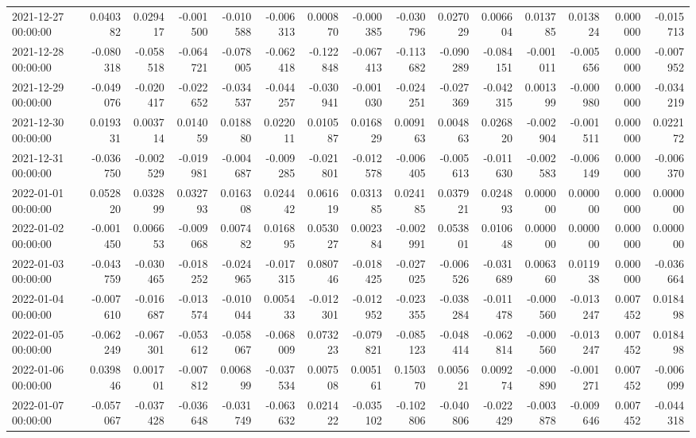 \begin{tabular}{lrrrrrrrrrrrrrr}
2021-12-27 00:00:00 & 0.040382 & 0.029417 & -0.001500 & -0.010588 & -0.006313 & 0.000870 & -0.000385 & -0.030796 & 0.027029 & 0.006604 & 0.013785 & 0.013824 & 0.000000 & -0.015713 \\
2021-12-28 00:00:00 & -0.080318 & -0.058518 & -0.064721 & -0.078005 & -0.062418 & -0.122848 & -0.067413 & -0.113682 & -0.090289 & -0.084151 & -0.001011 & -0.005656 & 0.000000 & -0.007952 \\
2021-12-29 00:00:00 & -0.049076 & -0.020417 & -0.022652 & -0.034537 & -0.044257 & -0.030941 & -0.001030 & -0.024251 & -0.027369 & -0.042315 & 0.001399 & -0.000980 & 0.000000 & -0.034219 \\
2021-12-30 00:00:00 & 0.019331 & 0.003714 & 0.014059 & 0.018880 & 0.022011 & 0.010587 & 0.016829 & 0.009163 & 0.004863 & 0.026820 & -0.002904 & -0.001511 & 0.000000 & 0.022172 \\
2021-12-31 00:00:00 & -0.036750 & -0.002529 & -0.019981 & -0.004687 & -0.009285 & -0.021801 & -0.012578 & -0.006405 & -0.005613 & -0.011630 & -0.002583 & -0.006149 & 0.000000 & -0.006370 \\
2022-01-01 00:00:00 & 0.052820 & 0.032899 & 0.032793 & 0.016308 & 0.024442 & 0.061619 & 0.031385 & 0.024185 & 0.037921 & 0.024893 & 0.000000 & 0.000000 & 0.000000 & 0.000000 \\
2022-01-02 00:00:00 & -0.001450 & 0.006653 & -0.009068 & 0.007482 & 0.016895 & 0.053027 & 0.002384 & -0.002991 & 0.053801 & 0.010648 & 0.000000 & 0.000000 & 0.000000 & 0.000000 \\
2022-01-03 00:00:00 & -0.043759 & -0.030465 & -0.018252 & -0.024965 & -0.017315 & 0.080746 & -0.018425 & -0.027025 & -0.006526 & -0.031689 & 0.006360 & 0.011938 & 0.000000 & -0.036664 \\
2022-01-04 00:00:00 & -0.007610 & -0.016687 & -0.013574 & -0.010044 & 0.005433 & -0.012301 & -0.012952 & -0.023355 & -0.038284 & -0.011478 & -0.000560 & -0.013247 & 0.007452 & 0.018498 \\
2022-01-05 00:00:00 & -0.062249 & -0.067301 & -0.053612 & -0.058067 & -0.068009 & 0.073223 & -0.079821 & -0.085123 & -0.048414 & -0.062814 & -0.000560 & -0.013247 & 0.007452 & 0.018498 \\
2022-01-06 00:00:00 & 0.039846 & 0.001701 & -0.007812 & 0.006899 & -0.037534 & 0.007508 & 0.005161 & 0.150370 & 0.005621 & 0.009274 & -0.000890 & -0.001271 & 0.007452 & -0.006099 \\
2022-01-07 00:00:00 & -0.057067 & -0.037428 & -0.036648 & -0.031749 & -0.063632 & 0.021422 & -0.035102 & -0.102806 & -0.040806 & -0.022429 & -0.003878 & -0.009646 & 0.007452 & -0.044318 \\

\end{tabular}
